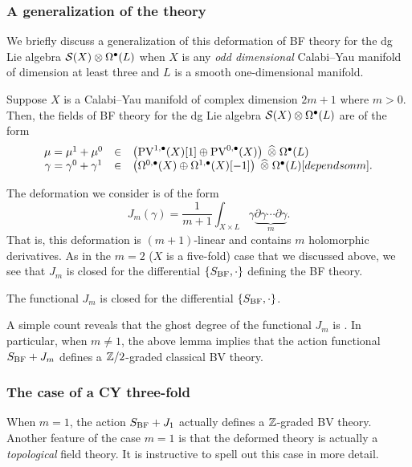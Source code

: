 \documentclass[11pt]{amsart}
\def\pv{{\rm PV}}
\begin{document}
\subsubsection{A generalization of the theory}

We briefly discuss a generalization of this deformation of BF theory for the dg Lie algebra $\mathcal S(X) \otimes \Omega^\bullet(L)$ when $X$ is any {\em odd dimensional} Calabi--Yau manifold of dimension at least three and $L$ is a smooth one-dimensional manifold.

Suppose $X$ is a Calabi--Yau manifold of complex dimension $2m+1$ where $m > 0$.
Then, the fields of BF theory for the dg Lie algebra $\mathcal S(X) \otimes \Omega^{\bullet}(L)$ are of the form
\[
  \begin{array}{ccl}
    \mu = \mu^1+\mu^0 & \in & \left(\pv^{1,\bu}(X)[1] \oplus \pv^{0,\bu}(X) \right) \; \Hat{\otimes} \; \Omega^{\bu}(L) \\
    \gamma = \gamma^0 + \gamma^1 & \in & \left(\Omega^{0,\bu}(X) \oplus \Omega^{1,\bu}(X)[-1] \right) \; \Hat{\otimes}\; \Omega^{\bu}(L)[depends on m] .
  \end{array}
\]

The deformation we consider is of the form
\[
  J_m (\gamma) = \frac{1}{m+1} \int_{X \times L} \gamma \underbrace{\partial \gamma \cdots \partial \gamma}_{m} .
\]
That is, this deformation is $(m+1)$-linear and contains $m$ holomorphic derivatives.
As in the $m=2$ ($X$ is a five-fold) case that we discussed above, we see that $J_m$ is closed for the differential $\{S_{\rm BF},\cdot\}$ defining the BF theory.

\begin{lem}
  The functional $J_m$ is closed for the differential $\{S_{\rm BF}, \cdot \}$.
\end{lem}

A simple count reveals that the ghost degree of the functional $J_m$ is .
In particular, when $m \ne 1$, the above lemma implies that the action functional $S_{\rm BF} + J_m$ defines a $\mathbb Z/2$-graded classical BV theory.

\subsubsection{The case of a CY three-fold}

When $m=1$, the action $S_{\rm BF} + J_1$ actually defines a $\mathbb Z$-graded BV theory.
Another feature of the case $m=1$ is that the deformed theory is actually a {\em topological} field theory.
It is instructive to spell out this case in more detail.
\end{document}
